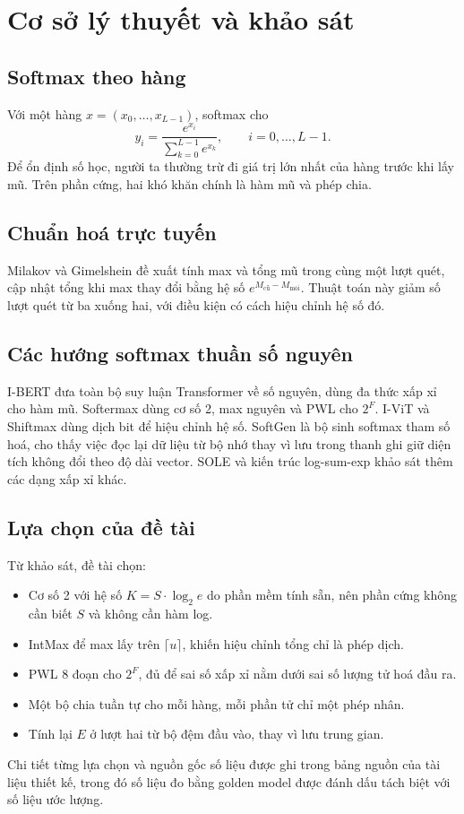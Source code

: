\section{Cơ sở lý thuyết và khảo sát}

\subsection{Softmax theo hàng}

Với một hàng $x = (x_0, \dots, x_{L-1})$, softmax cho
\begin{equation}
  y_i = \frac{e^{x_i}}{\sum_{k=0}^{L-1} e^{x_k}}, \qquad i = 0, \dots, L-1.
\end{equation}
Để ổn định số học, người ta thường trừ đi giá trị lớn nhất của hàng trước khi lấy mũ. Trên phần cứng, hai khó khăn chính là hàm mũ và phép chia.

\subsection{Chuẩn hoá trực tuyến}

Milakov và Gimelshein \cite{milakov2018} đề xuất tính max và tổng mũ trong cùng một lượt quét, cập nhật tổng khi max thay đổi bằng hệ số $e^{M_{\text{cũ}}-M_{\text{mới}}}$. Thuật toán này giảm số lượt quét từ ba xuống hai, với điều kiện có cách hiệu chỉnh hệ số đó.

\subsection{Các hướng softmax thuần số nguyên}

I-BERT \cite{kim2021ibert} đưa toàn bộ suy luận Transformer về số nguyên, dùng đa thức xấp xỉ cho hàm mũ. Softermax \cite{stevens2021softermax} dùng cơ số 2, max nguyên và PWL cho $2^{F}$. I-ViT và Shiftmax \cite{li2023ivit} dùng dịch bit để hiệu chỉnh hệ số. SoftGen \cite{wei2020softgen} là bộ sinh softmax tham số hoá, cho thấy việc đọc lại dữ liệu từ bộ nhớ thay vì lưu trong thanh ghi giữ diện tích không đổi theo độ dài vector. SOLE \cite{wang2025sole} và kiến trúc log-sum-exp \cite{wang2018lse} khảo sát thêm các dạng xấp xỉ khác.

\subsection{Lựa chọn của đề tài}

Từ khảo sát, đề tài chọn:
\begin{itemize}
  \item Cơ số 2 với hệ số $K = S \cdot \log_2 e$ do phần mềm tính sẵn, nên phần cứng không cần biết $S$ và không cần hàm log.
  \item IntMax để max lấy trên $\lceil u \rceil$, khiến hiệu chỉnh tổng chỉ là phép dịch.
  \item PWL 8 đoạn cho $2^{F}$, đủ để sai số xấp xỉ nằm dưới sai số lượng tử hoá đầu ra.
  \item Một bộ chia tuần tự cho mỗi hàng, mỗi phần tử chỉ một phép nhân.
  \item Tính lại $E$ ở lượt hai từ bộ đệm đầu vào, thay vì lưu trung gian.
\end{itemize}

Chi tiết từng lựa chọn và nguồn gốc số liệu được ghi trong bảng nguồn của tài liệu thiết kế, trong đó số liệu đo bằng golden model được đánh dấu tách biệt với số liệu ước lượng.

